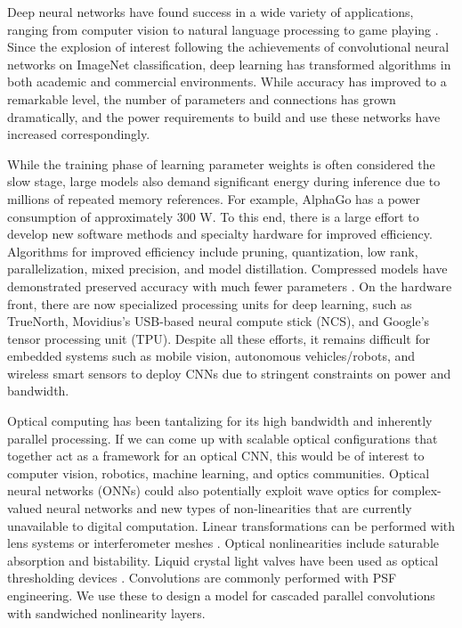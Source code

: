 Deep neural networks have found success in a wide variety of applications, ranging from computer vision to natural language processing to game playing \cite{lecun2015deep}. Since the explosion of interest following the achievements of convolutional neural networks on ImageNet classification, deep learning has transformed algorithms in both academic and commercial environments. While accuracy has improved to a remarkable level, the number of parameters and connections has grown dramatically, and the power requirements to build and use these networks have increased correspondingly. 

While the training phase of learning parameter weights is often considered the slow stage, large models also demand significant energy during inference due to millions of repeated memory references. For example, AlphaGo has a power consumption of approximately 300 W. To this end, there is a large effort to develop new software methods and specialty hardware for improved efficiency. Algorithms for improved efficiency include pruning, quantization, low rank, parallelization, mixed precision, and model distillation. Compressed models have demonstrated preserved accuracy with much fewer parameters \cite{han2015deep,iandola2016squeezenet}. On the hardware front, there are now specialized processing units for deep learning, such as TrueNorth, Movidius's USB-based neural compute stick (NCS), and Google's tensor processing unit (TPU). Despite all these efforts, it remains difficult for embedded systems such as mobile vision, autonomous vehicles/robots, and wireless smart sensors to deploy CNNs due to stringent constraints on power and bandwidth. 

Optical computing has been tantalizing for its high bandwidth and inherently parallel processing. If we can come up with scalable optical configurations that together act as a framework for an optical CNN, this would be of interest to computer vision, robotics, machine learning, and optics communities. Optical neural networks (ONNs) could also potentially exploit wave optics for complex-valued neural networks and new types of non-linearities that are currently unavailable to digital computation. Linear transformations can be performed with lens systems or interferometer meshes \cite{shen2017deep}. Optical nonlinearities include saturable absorption and bistability. Liquid crystal light valves have been used as optical thresholding devices \cite{saxena1995adaptive}. Convolutions are commonly performed with PSF engineering. We use these to design a model for cascaded parallel convolutions with sandwiched nonlinearity layers.


